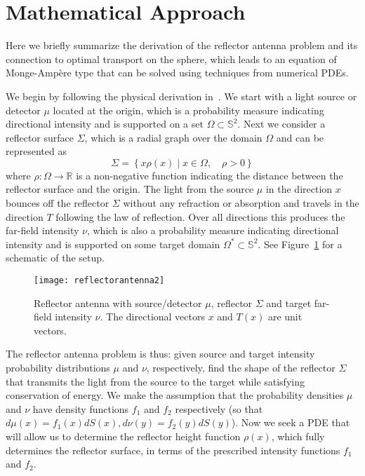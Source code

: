 \documentclass{amsart}
\newcommand{\Sf}{\mathbb{S}^{2}}
\newcommand{\MA}{Monge-Amp\`ere\xspace}
\theoremstyle{lemma}
\theoremstyle{remark}
\begin{document}
\section{Mathematical Approach}\label{sec:background}

Here we briefly summarize the derivation of the reflector antenna problem and its connection to optimal transport on the sphere, which leads to an equation of \MA type that can be solved using techniques from numerical PDEs. 

We begin by following the physical derivation in~\cite{Wang_Reflector, Wang_Reflector2}. We start with a light source or detector $\mu$ located at the origin, which is a probability measure indicating directional intensity and is supported on a set $\Omega \subset \mathbb{S}^2$. Next we consider a reflector surface $\Sigma$, which is a radial graph over the domain $\Omega$ and can be represented as
\begin{equation}
\Sigma = \left\{ x\rho(x) \mid x \in \Omega, \quad \rho>0 \right\}
\end{equation}
where $\rho: \Omega \rightarrow \mathbb{R}$ is a non-negative function indicating the distance between the reflector surface and the origin. The light from the source $\mu$ in the direction $x$ bounces off the reflector $\Sigma$ without any refraction or absorption and travels in the direction $T$ following the law of reflection. Over all directions this produces the far-field intensity $\nu$, which is also a probability measure indicating directional intensity and is supported on some target domain $\Omega^{*} \subset \Sf$. See Figure~\ref{fig:reflectorantenna} for a schematic of the setup.

\begin{figure}[htp]
\texttt{[image: reflectorantenna2]}
\caption{Reflector antenna with source/detector $\mu$, reflector $\Sigma$ and target far-field intensity $\nu$. The directional vectors $x$ and $T(x)$ are unit vectors.}\label{fig:reflectorantenna}
\end{figure}

The reflector antenna problem is thus: given source and target intensity probability distributions $\mu$ and $\nu$, respectively, find the shape of the reflector $\Sigma$ that transmits the light from the source to the target while satisfying conservation of energy.
We make the assumption that the probability densities $\mu$ and $\nu$ have density functions $f_1$ and $f_2$ respectively (so that $d\mu(x) = f_1(x)dS(x), d\nu(y) = f_2(y)dS(y)$).  Now we seek a PDE that will allow us to determine the reflector height function $\rho(x)$, which fully determines the reflector surface, in terms of the prescribed intensity functions $f_1$ and $f_2$.
\end{document}
